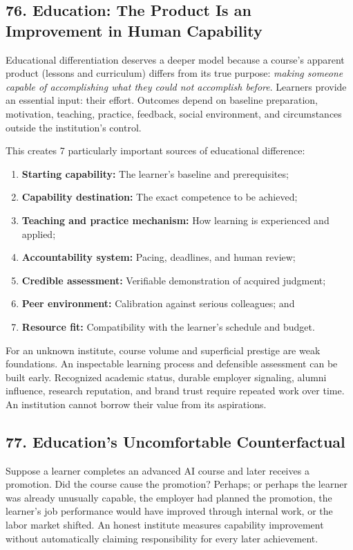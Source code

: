 \subsection*{76. Education: The Product Is an Improvement in Human Capability}

Educational differentiation deserves a deeper model because a course's apparent product (lessons and curriculum) differs from its true purpose: \emph{making someone capable of accomplishing what they could not accomplish before}. Learners provide an essential input: their effort. Outcomes depend on baseline preparation, motivation, teaching, practice, feedback, social environment, and circumstances outside the institution's control.

This creates 7 particularly important sources of educational difference:

\begin{enumerate}
    \item \textbf{Starting capability:} The learner's baseline and prerequisites;
    \item \textbf{Capability destination:} The exact competence to be achieved;
    \item \textbf{Teaching and practice mechanism:} How learning is experienced and applied;
    \item \textbf{Accountability system:} Pacing, deadlines, and human review;
    \item \textbf{Credible assessment:} Verifiable demonstration of acquired judgment;
    \item \textbf{Peer environment:} Calibration against serious colleagues; and
    \item \textbf{Resource fit:} Compatibility with the learner's schedule and budget.
\end{enumerate}

For an unknown institute, course volume and superficial prestige are weak foundations. An inspectable learning process and defensible assessment can be built early. Recognized academic status, durable employer signaling, alumni influence, research reputation, and brand trust require repeated work over time. An institution cannot borrow their value from its aspirations.

\subsection*{77. Education's Uncomfortable Counterfactual}

Suppose a learner completes an advanced AI course and later receives a promotion. Did the course cause the promotion? Perhaps; or perhaps the learner was already unusually capable, the employer had planned the promotion, the learner's job performance would have improved through internal work, or the labor market shifted. An honest institute measures capability improvement without automatically claiming responsibility for every later achievement.

